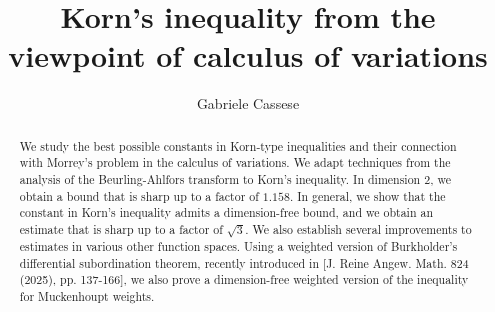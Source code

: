 \documentclass[11pt, a4paper]{amsart}
\title{
Korn's inequality from the viewpoint of
calculus of variations
}
\theoremstyle{definition}
\theoremstyle{remark}
\begin{document}

\author{
    Gabriele Cassese
}

\address{
University of Oxford,
Mathematical Institute,
Radcliffe Observatory Quarter,
OX2 6GG,
Oxford,
United Kingdom
}


\begin{abstract}
We study the best possible constants in Korn-type
inequalities and their connection with
Morrey's problem in the calculus of variations.
We adapt techniques from the analysis of the
Beurling-Ahlfors transform to Korn's inequality.
In dimension $2$, we obtain a bound that is sharp up to a factor of $1.158$. In general, we show that the constant
in Korn's inequality admits a dimension-free bound, 
and we obtain an estimate that is sharp
up to a factor of $\sqrt 3$. 
We also establish several improvements to estimates
in various other function spaces.
Using a weighted version of 
Burkholder's differential subordination theorem, 
recently introduced in 
[J. Reine Angew. Math. 824 (2025), pp. 137-166],
we also prove a dimension-free
weighted version of the inequality
for Muckenhoupt weights.
\end{abstract}
\maketitle
\end{document}
